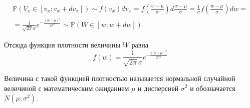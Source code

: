 \documentclass[11pt,russian,]{article}
\renewcommand{\P}{\mathbb{P}}
\begin{document}
\begin{multline}
\P(V_x \in [v_x;v_x + dv_x]) \sim f(v_x) dv_x = f\left(\frac{w-\mu}{\sigma}\right) d\frac{w-\mu}{\sigma} = \frac{1}{\sigma} f\left(\frac{w-\mu}{\sigma}\right) dw = \\
= \frac{1}{\sqrt{2\pi} \sigma} e^{-\frac{(w-\mu)^2}{2\sigma^2}} \sim \P(W \in [w;w + dw])
\end{multline}

Отсюда функция плотности величины \(W\) равна \[
f(w) =  \frac{1}{\sqrt{2\pi} \sigma} e^{-\frac{(w-\mu)^2}{2\sigma^2}}
\]

Величина с такой функцией плотностью называется нормальной случайной
величиной с математическим ожиданием \(\mu\) и дисперсией \(\sigma^2\) и
обозначается \(N(\mu; \sigma^2)\).

\printbibliography
\end{document}
